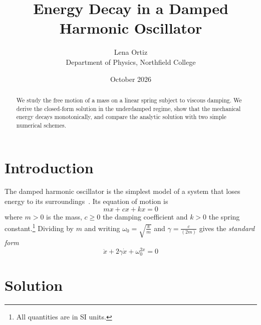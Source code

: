 \documentclass[11pt,a4paper]{article}
\title{Energy Decay in a Damped Harmonic Oscillator}
\author{Lena Ortiz\\ \small Department of Physics, Northfield College}
\date{October 2026}
\begin{document}
\maketitle

\begin{abstract}
We study the free motion of a mass on a linear spring subject to viscous damping. We derive the closed-form solution in the underdamped regime, show that the mechanical energy decays monotonically, and compare the analytic solution with two simple numerical schemes.
\end{abstract}

\section{Introduction}\label{sec:intro}

The damped harmonic oscillator is the simplest model of a system that loses energy to its surroundings~\cite{ref1}. Its equation of motion is
\begin{equation}
  mx\ddot{}+cx\dot{}+kx=0
  \label{eq:gauss}
\end{equation}
where $m>0$ is the mass, $c\geq0$ the damping coefficient and $k>0$ the spring constant.\footnote{All quantities are in SI units.} Dividing by $m$ and writing $\omega_{0}=\sqrt{\frac{k}{m}}$ and $\gamma=\frac{c}{(2m)}$ gives the \emph{standard form}
\begin{equation}
  \ddot{x}+2\gamma\dot{x}+\omega_{0}^{2x}=0
  \label{eq:2}
\end{equation}

\section{Solution}
\end{document}
